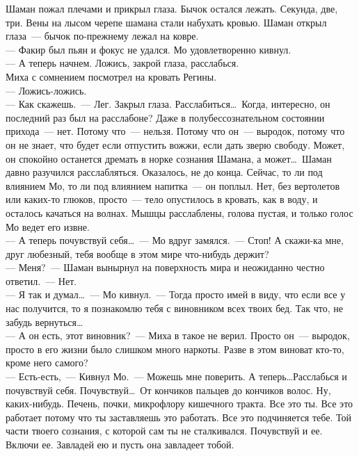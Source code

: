 Шаман пожал плечами и прикрыл глаза. Бычок остался лежать. Секунда, две, три. 
Вены на лысом черепе шамана стали набухать кровью. Шаман открыл глаза~--- бычок 
по-прежнему лежал на ковре.\\
--- Факир был пьян и фокус не удался. Мо удовлетворенно кивнул.\\ 
--- А теперь начнем. Ложись, закрой глаза, расслабься.\\
Миха с сомнением посмотрел на кровать Регины. \\
--- Ложись-ложись.\\
--- Как скажешь.~--- Лег. Закрыл глаза. Расслабиться\ldots\ Когда, интересно, он 
последний раз был на расслабоне? Даже в полубессознательном состоянии 
прихода~--- нет. Потому что~--- нельзя. Потому что он~--- выродок, потому что он не знает, 
что будет если отпустить вожжи, если дать зверю свободу. Может, он спокойно 
останется дремать в норке сознания Шамана, а может\ldots\ Шаман давно разучился 
расслабляться. Оказалось, не до конца. Сейчас, то ли под влиянием Мо, то ли под 
влиянием напитка~--- он поплыл. Нет, без вертолетов или каких-то глюков, 
просто~--- тело опустилось в кровать, как в воду, и осталось качаться на волнах. Мышцы 
расслаблены, голова пустая, и только голос Мо ведет его извне.\\
--- А теперь почувствуй себя\ldots~--- Мо вдруг замялся.~--- Стоп! А скажи-ка 
мне, друг любезный, тебя вообще в этом мире что-нибудь держит?\\
--- Меня?~--- Шаман вынырнул на поверхность мира и неожиданно честно ответил.~--- 
Нет.\\
--- Я так и думал\ldots~--- Мо кивнул.~--- Тогда просто имей в виду, что если все 
у нас получится, то я познакомлю тебя с виновником всех твоих бед. Так что, не забудь 
вернуться\ldots\\
--- А он есть, этот виновник?~--- Миха в такое не верил. Просто он~--- выродок, 
просто в его жизни было слишком много наркоты. Разве в этом виноват кто-то, кроме него 
самого?\\
--- Есть-есть,~--- Кивнул Мо.~--- Можешь мне поверить. А теперь\ldots Расслабься и 
почувствуй себя. Почувствуй\ldots\ От кончиков пальцев до кончиков волос. Ну, 
каких-нибудь. Печень, почки, микрофлору кишечного тракта. Все это ты. Все это 
работает потому что ты заставляешь это работать. Все это подчиняется тебе. Той 
части твоего сознания, с которой сам ты не сталкивался. Почувствуй и ее. Включи 
ее. Завладей ею и пусть она завладеет тобой. 

